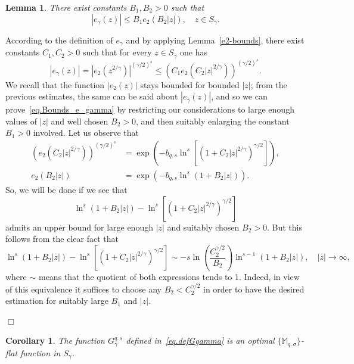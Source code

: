 \documentclass[11pt,a4paper]{article}
\theoremstyle{plain}
\newtheorem{lemma}[theo]{Lemma}
\newtheorem{coro}[theo]{Corollary}
\theoremstyle{definition}
\newenvironment{proof1}{\medskip\par\noindent{\bf Proof.}}{\hfill $\Box$
\medskip\par}
\def\ga{\gamma}
\def\Ms{{\mathbb{M}}_{q,\sigma}}
\begin{document}
\begin{lemma}\label{egamma-bounds}
There exist constants $B_1,B_2>0$ such that
\begin{equation}\label{eq.Bounds_e_gamma}
|e_\gamma(z)|\leq B_1 e_2(B_2 |z|),\quad z\in S_\gamma.
\end{equation}
\end{lemma}
\begin{proof1}
According to the definition of $e_\ga$ and by applying Lemma~\ref{e2-bounds}, there exist constants
$C_1,C_2>0$ such that for every $z\in S_\ga$ one has
$$
|e_\gamma(z)|=\left|e_2(z^{2/\gamma})\right|^{(\gamma/2)^s}\leq \left(C_1 e_2(C_2 |z|^{2/\gamma})\right)^{(\ga/2)^s}.$$
We recall that the function $|e_2(z)|$ stays bounded
for bounded $|z|$; from the previous estimates, the same can be said about $|e_{\ga}(z)|$, and so we can prove~\eqref{eq.Bounds_e_gamma} by restricting our considerations to large enough values of $|z|$ and well chosen $B_2>0$, and then suitably enlarging the constant $B_1>0$ involved.
Let us observe that
\begin{align*}
\left(e_2(C_2 |z|^{2/\gamma})\right)^{(\ga/2)^s}&= \exp\left(-b_{q,s}\ln^s\left[(1+C_2|z|^{2/\ga})^{\ga/2}\right]\right),\\ e_2(B_2|z|)&=\exp\left(-b_{q,s}\ln^s(1+B_2|z|)\right).
\end{align*}
So, we will be done
if we see that
$$
\ln^s(1+B_2|z|)-\ln^s[(1+C_2|z|^{2/\ga})^{\ga/2}]
$$
admits an upper bound for large enough $|z|$ and suitably chosen $B_2>0$.
But this follows from the clear fact that
\begin{equation*}
\ln^s(1+B_2|z|)-\ln^s\left[\left(1+C_2|z|^{2/\ga}\right)^{\ga/2}\right]
\sim -s\ln\left(\frac{C_2^{\ga/2}}{B_2}\right)\ln^{s-1}(1+B_2|z|), \quad |z|\to\infty,
\end{equation*}
where $\sim$ means that the quotient of both expressions tends to 1.
Indeed, in view of this equivalence it suffices to choose any $B_2<C_2^{\ga/2}$ in order to have the desired estimation for suitably large $B_1$ and $|z|$.

\end{proof1}

\begin{coro}\label{coro.FlatFunctionSgamma}
The function $G_{\ga}^{q,s}$ defined in~\eqref{eq.defGgamma} is an optimal $\{\Ms\}$-flat function in $S_{\ga}$.
\end{coro}
\end{document}
